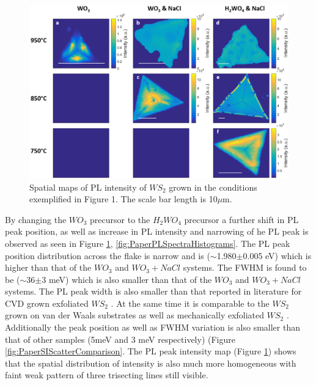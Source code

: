 \begin{figure}[h]
\begin{center}
\includegraphics[scale=0.3]{PaperPLMaps.png}
\caption{Spatial maps of PL intensity of $WS_2$ grown in the conditions exemplified in Figure 1. The scale bar length is 10$\mu$m.}
\label{fig:PaperPLMaps}
\end{center}
\end{figure}

By changing the $WO_3$ precursor to the $H_2WO_4$ precursor a further shift in PL peak position, as well as increase in PL intensity and narrowing of he PL peak is observed as seen in Figure \ref{fig:PaperPLMaps}, \ref{fig:PaperPLSpectraHistograms}. The PL peak position distribution across the flake is narrow and is ({$\sim$}1.980{$\pm$}0.005 eV) which is higher than that of the $WO_3$ and $WO_3 + NaCl$ systems. The FWHM is found to be ({$\sim$}36{$\pm$}3 meV) which is also smaller than that of the $WO_3$ and $WO_3 + NaCl$ systems. The PL peak width is also smaller than that reported in literature for CVD grown \cite{ExtraordinaryRoomTemperaturePhotoluminescenceInTriangularWS2Monolayers}\cite{Rong2014}\cite{Hu2016}\cite{Kang2015a} exfoliated $WS_2$ \cite{EvolutionOfElectronicStructureInAtomicallyThinSheetsOfWS2AndWSe2}\cite{doi:10.1021/nn5059908}. At the same time it is comparable to the $WS_2$ grown on van der Waals substrates \cite{doi:10.1021/nn503093k} as well as mechanically exfoliated $WS_2$ \cite{doi:10.1021/nl500171v}. Additionally the peak position as well as FWHM variation is also smaller than that of other samples (5meV and 3 meV respectively) (Figure \ref{fig:PaperSIScatterComparison}. The PL peak intensity map (Figure \ref{fig:PaperPLMaps}) shows that the spatial distribution of intensity is also much more homogeneous with faint weak pattern of three trisecting lines still visible.

